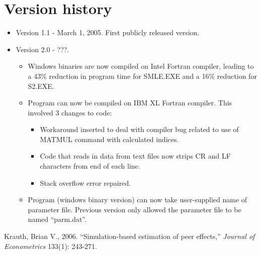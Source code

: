 \documentclass{article}
\begin{document}
\section{Version history}

\begin{itemize}
	\item Version 1.1 - March 1, 2005. First publicly released version.
	\item Version 2.0 - ???.
		\begin{itemize}
			\item Windows binaries are now compiled on Intel Fortran compiler, leading to 
				a 43\% reduction in program time for SMLE.EXE and a 16\% reduction
				for S2.EXE.
			\item Program can now be compiled on IBM XL Fortran compiler.  This involved 3 changes to code:
				\begin{itemize}
					\item Workaround inserted to deal with compiler bug related to use of
						MATMUL command with calculated indices.
					\item Code that reads in data from text files now strips CR and LF characters from
						end of each line.
					\item Stack overflow error repaired.  
				\end{itemize}
			\item Program (windows binary version) can now take user-supplied name of parameter file.  
					Previous version only	allowed the parameter file to be named ``parm.dat''.  
		\end{itemize}
\end{itemize}


\begin{thebibliography}{breitestes Label}
Krauth, Brian V., 2006.  ``Simulation-based estimation of peer effects,'' 
{\it Journal of Econometrics} 133(1): 243-271. 
	
\end{thebibliography}
\end{document}
